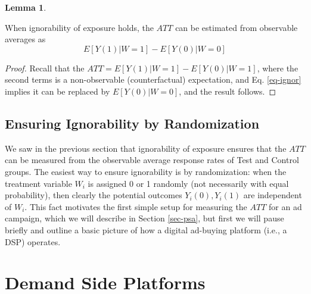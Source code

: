 \documentclass[11pt,a4paper]{article}
\theoremstyle{definition}
\theoremstyle{remark}
\theoremstyle{definition}
\theoremstyle{definition}
\theoremstyle{definition}
\theoremstyle{definition}
\theoremstyle{definition}
\theoremstyle{definition}
\newtheorem{lemma}[theorem]{Lemma}
\begin{document}
\begin{lemma} \label{lem-ignor-att}\small

\small When ignorability of exposure holds, the $ATT$ can be estimated from observable averages as 
$$
E[Y(1) | W = 1] - E[ Y(0) | W = 0]
$$
\begin{proof}\small
Recall that the $ATT = E[Y(1) | W=1] - E[Y(0) | W=1]$, where the second terms is a non-observable (counterfactual) expectation, and Eq. \ref{eq-ignor} implies it can be replaced by $E[Y(0) | W=0]$, and the result follows.
\end{proof}
\end{lemma}





\subsection{Ensuring Ignorability by Randomization}

We saw in the previous section that ignorability of exposure ensures that the $ATT$ can be measured from the observable average response rates of Test and Control groups. The easiest way to ensure ignorability is by randomization: when the treatment variable $W_i$ is assigned 0 or 1 randomly (not necessarily with equal probability), then clearly the potential outcomes $Y_i(0), Y_i(1)$ are independent of $W_i$. This fact motivates the first simple setup for measuring the $ATT$ for an ad campaign, which we will describe in Section \ref{sec-psa}, but first we will pause briefly and outline a basic picture of how a  digital ad-buying platform (i.e., a DSP) operates.


\section{Demand Side Platforms} \label{sec-rtb}
\end{document}
